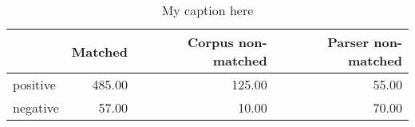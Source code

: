 \begin{table}[!ht]
\centering
\begin{tabular}{lrrr}
\toprule
{} &  Matched &  Corpus non-matched &  Parser non-matched \\
\midrule
positive &   485.00 &              125.00 &               55.00 \\
negative &    57.00 &               10.00 &               70.00 \\
\bottomrule
\end{tabular}
\caption{My caption here}
\label{tab:POLARITY-ocd-data}
\end{table}